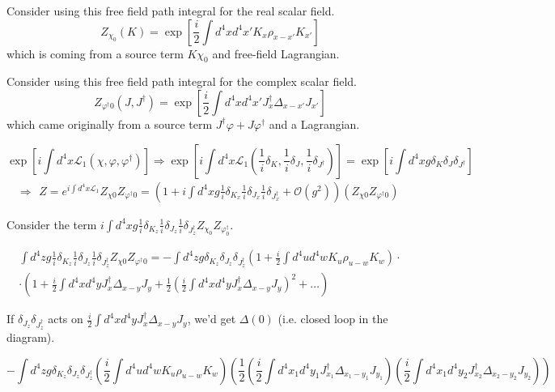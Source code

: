 \documentclass[twoside]{amsart}
\begin{document}
Consider using this free field path integral for the real scalar field.  
\[
Z_{\chi_0}(K) = \exp{ \left[ \frac{i}{2} \int d^4x d^4x' K_x \rho_{x-x'} K_{x'} \right] }
\]
which is coming from a source term $K \chi_0$ and free-field Lagrangian.  

Consider using this free field path integral for the complex scalar field.
\[
Z_{\varphi^{\dag} 0}(J,J^{\dag}) = \exp{ \left[ \frac{i}{2} \int d^4x d^4x' J^{\dag}_x \Delta_{x-x'} J_{x'} \right] }
\]
which came originally from a source term $J^{\dag} \varphi + J \varphi^{\dag}$ and a Lagrangian. 

\[
\exp{ \left[ i \int d^4x \mathcal{L}_1( \chi, \varphi, \varphi^{\dag} ) \right] } \Longrightarrow \exp{ \left[ i \int d^4x \mathcal{L}_1\left( \frac{1}{i} \delta_K , \frac{1}{i} \delta_J , \frac{1}{i} \delta_{J^{\dag}} \right) \right] } = \exp{ \left[ i \int d^4x g \delta_K \delta_J \delta_{J^{\dag}} \right] }
\]
\[
\Longrightarrow \begin{gathered}
  Z = e^{i \int d^4x \mathcal{L}_1 }Z_{\chi 0} Z_{\varphi^{\dag} 0}   = \left( 1 + i \int d^4x g \frac{1}{i} \delta_{K_x} \frac{1}{i} \delta_{J_x} \frac{1}{i} \delta_{J_x^{\dag}} + \mathcal{O}(g^2) \right) ( Z_{\chi 0} Z_{\varphi^{\dag}0 } )
\end{gathered}
\]

Consider the term $i \int d^4x g \frac{1}{i} \delta_{K_z} \frac{1}{i} \delta_{J_z} \frac{1}{i} \delta_{J_z^{\dag}} Z_{\chi_0} Z_{\varphi^{\dag}_0 }$.  

\[
\begin{gathered}
  \int d^4z g \frac{1}{i} \delta_{K_z} \frac{1}{i} \delta_{J_z} \frac{1}{i} \delta_{J^{\dag}_z} Z_{\chi 0} Z_{\varphi^{\dag} 0 } = - \int d^4z g \delta_{K_z} \delta_{J_z} \delta_{J^{\dag}_z} \left( 1 + \frac{i}{2} \int d^4u d^4w K_u \rho_{u -w} K_w \right) \cdot \\ 
  \cdot \left( 1 + \frac{i}{2} \int d^4x d^4y J_x^{\dag} \Delta_{x-y} J_y + \frac{1}{2} \left( \frac{i}{2} \int d^4x d^4y J_x^{\dag} \Delta_{x-y} J_y \right)^2 + \dots \right) 
\end{gathered}
\]

If $\delta_{J_z} \delta_{J^{\dag}_z}$ acts on $\frac{i}{2} \int d^4x d^4y J_x^{\dag} \Delta_{x-y} J_y$, we'd get $\Delta(0)$ (i.e. closed loop in the diagram).  

\[
- \int d^4z g \delta_{K_z} \delta_{J_z} \delta_{J_z^{\dag}} \left( \frac{i}{2} \int d^4u d^4w K_u \rho_{u-w} K_w \right) \left( \frac{1}{2} \left( \frac{i}{2} \int d^4x_1 d^4y_1 J_{x_1}^{\dag} \Delta_{x_1- y_1} J_{y_1} \right) \left( \frac{i}{2} \int d^4x_1 d^4y_2 J_{x_2}^{\dag} \Delta_{x_2 - y_2} J_{y_2} \right) \right)
\]
\end{document}
